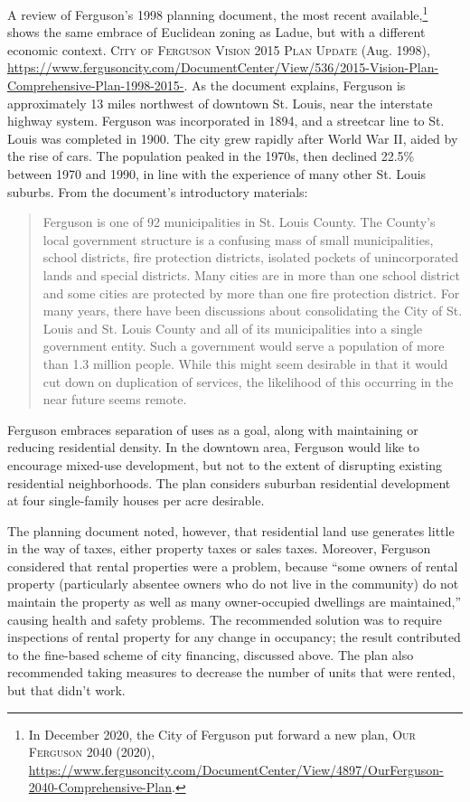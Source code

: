 A review of Ferguson's 1998 planning document, the most recent
available,\footnote{In December 2020, the City of Ferguson put forward a new
plan, \textsc{Our Ferguson 2040} (2020),
\url{https://www.fergusoncity.com/DocumentCenter/View/4897/OurFerguson-2040-Comprehensive-Plan}.}
shows the same embrace of Euclidean zoning as Ladue, but with a different
economic context. \textsc{City of Ferguson Vision 2015 Plan Update} (Aug. 1998),
\url{https://www.fergusoncity.com/DocumentCenter/View/536/2015-Vision-Plan-Comprehensive-Plan-1998-2015-}.
As the document explains, Ferguson is approximately 13 miles northwest of
downtown St. Louis, near the interstate highway system. Ferguson was
incorporated in 1894, and a streetcar line to St. Louis was completed in 1900.
The city grew rapidly after World War II, aided by the rise of cars. The
population peaked in the 1970s, then declined 22.5\% between 1970 and 1990, in
line with the experience of many other St. Louis suburbs. From the document's
introductory materials:
\begin{quote}
Ferguson is one of 92 municipalities in St. Louis County. The County's local
government structure is a confusing mass of small municipalities, school
districts, fire protection districts, isolated pockets of unincorporated lands
and special districts. Many cities are in more than one school district and some
cities are protected by more than one fire protection district. For many years,
there have been discussions about consolidating the City of St. Louis and St.
Louis County and all of its municipalities into a single government entity. Such
a government would serve a population of more than 1.3 million people. While
this might seem desirable in that it would cut down on duplication of services,
the likelihood of this occurring in the near future seems remote.
\end{quote}

Ferguson embraces separation of uses as a goal, along with maintaining or
reducing residential density. In the downtown area, Ferguson would like to
encourage mixed-use development, but not to the extent of disrupting existing
residential neighborhoods. The plan considers suburban residential development
at four single-family houses per acre desirable. 

The planning document noted, however, that residential land use generates little
in the way of taxes, either property taxes or sales taxes. Moreover, Ferguson
considered that rental properties were a problem, because ``some owners of
rental property (particularly absentee owners who do not live in the community)
do not maintain the property as well as many owner-occupied dwellings are
maintained,'' causing health and safety problems. The recommended solution was
to require inspections of rental property for any change in occupancy; the
result contributed to the fine-based scheme of city financing, discussed above.
The plan also recommended taking measures to decrease the number of units that
were rented, but that didn't work.

